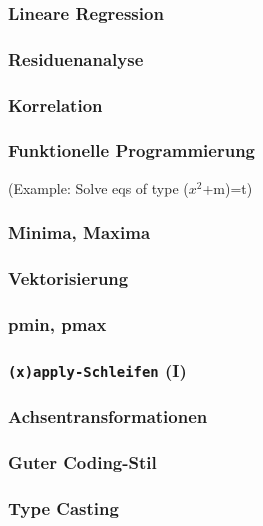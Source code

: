 \documentclass[paper=A4, pagesize, DIV=calc, smallheadings,
fontsize=12pt, expansion=false]{scrreprt}
\begin{document}
\subsubsection{Lineare Regression}

\subsubsection{Residuenanalyse}

\subsubsection{Korrelation}

\subsubsection*{Funktionelle Programmierung}
(Example: Solve eqs of type ($x^2$+m)=t)

\subsubsection*{Minima, Maxima}

\subsubsection*{Vektorisierung}

\subsubsection*{pmin, pmax}

\subsubsection*{\texttt{(x)apply-Schleifen} (I)}

\subsubsection*{Achsentransformationen}


\subsubsection*{Guter Coding-Stil}

\subsubsection*{Type Casting}
\end{document}
